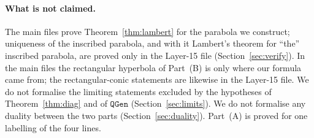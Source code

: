 \documentclass[11pt]{article}
\theoremstyle{definition}
\theoremstyle{remark}
\newcommand{\lean}[1]{\texttt{#1}}
\begin{document}
\paragraph{What is not claimed.} The main files prove Theorem~\ref{thm:lambert} for the parabola
we construct; uniqueness of the inscribed parabola, and with it Lambert's theorem for ``the'' inscribed
parabola, are proved only in the Layer-15 file (Section~\ref{sec:verify}). In the main files the
rectangular hyperbola of Part~(B) is only where our formula came from; the rectangular-conic statements
are likewise in the Layer-15 file. We do not formalise the limiting statements excluded by the
hypotheses of Theorem~\ref{thm:diag} and of $\lean{QGen}$ (Section~\ref{sec:limits}).
We do not formalise any duality between the two parts (Section~\ref{sec:duality}). Part~(A) is proved
for one labelling of the four lines.
\end{document}
